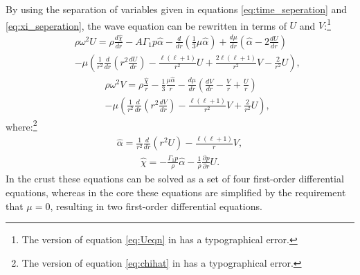 \documentclass[fleqn,usenatbib]{mnras}
\begin{document}
By using the separation of variables given in equations \ref{eq:time_seperation} and \ref{eq:xi_seperation}, the wave equation can be rewritten in terms of $U$ and $V$:\footnote{The version of equation \ref{eq:Ueqn} in \citet{mcdermott1988nonradial} has a typographical error.} 
\begin{align}\nonumber
&&\rho\omega^2U=\rho\frac{d\hat{\chi}}{dr}-A\Gamma_1 p\hat{\alpha}-\frac{d}{dr}\left(\frac{1}{3}\mu\hat{\alpha}\right)+\frac{d\mu}{dr}\left(\hat{\alpha}-2\frac{dU}{dr}\right)\\
&&-\mu\left(\frac{1}{r^2}\frac{d}{dr}\left( r^2\frac{dU}{dr}\right)-\frac{\ell(\ell+1)}{r^2}U+\frac{2\ell(\ell+1)}{r^2}V-\frac{2}{r^2}U\right),
\label{eq:Ueqn}
\end{align}
\begin{align}\nonumber
&&\rho\omega^2V=\rho\frac{\hat{\chi}}{r}-\frac{1}{3}\frac{\mu\hat{\alpha}}{r}-\frac{d\mu}{dr}\left(\frac{dV}{dr}-\frac{V}{r}+\frac{U}{r}\right)\\
&&-\mu\left(\frac{1}{r^2}\frac{d}{dr}\left(r^2\frac{dV}{dr}\right)-\frac{\ell(\ell+1)}{r^2}V+\frac{2}{r^2}U\right),
\label{eq:Veqn}
\end{align}
\noindent where:\footnote{The version of equation \ref{eq:chihat} in \citet{mcdermott1988nonradial} has a typographical error.}
\begin{align}
\hat{\alpha}=\frac{1}{r^2}\frac{d}{dr}(r^2U)-\frac{\ell(\ell+1)}{r}V,
\label{eq:alphahat}
\end{align}
\begin{align}
\hat{\chi}=-\frac{\Gamma_1p}{\rho}\hat{\alpha}-\frac{1}{\rho}\frac{\partial p}{\partial r}U.
\label{eq:chihat}
\end{align}
\noindent In the crust these equations can be solved as a set of four first-order differential equations, whereas in the core these equations are simplified by the requirement that $\mu=0$, resulting in two first-order differential equations.
\end{document}
